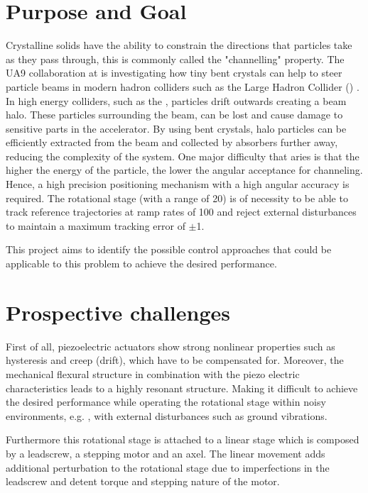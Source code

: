 \section{Purpose and Goal}
Crystalline solids have the ability to constrain the directions that particles take as they pass through, this is commonly called the "channelling" property. The UA9 collaboration at \abbrCERN is investigating how tiny bent crystals can help to steer particle beams in modern hadron colliders such as the Large Hadron Collider (\abbrLHC) \citep{WebsiteUA9:2016}. In high energy colliders, such as the \abbrLHC, particles drift outwards creating a beam halo. These particles surrounding the beam, can be lost and cause damage to sensitive parts in the accelerator. By using bent crystals, halo particles can be efficiently extracted from the beam and collected by absorbers further away, reducing the complexity of the system. One major difficulty that aries is that the higher the energy of the particle, the lower the angular acceptance for channeling. Hence, a high precision positioning mechanism with a high angular accuracy is required. The rotational stage (with a range of \unit{20}{\milli\rad}) is of necessity to be able to track reference trajectories at ramp rates of \unit{100}{\micro\radianpersecond} and reject external disturbances to maintain a maximum tracking error of $\pm$\unit{1}{\micro\rad}.

This project aims to identify the possible control approaches that could be applicable to this problem to achieve the desired performance.

\section{Prospective challenges}
First of all, piezoelectric  actuators show strong nonlinear properties such as hysteresis and creep (drift), which have to be compensated for. Moreover, the mechanical flexural structure in combination with the piezo electric characteristics leads to a highly resonant structure. Making it difficult to achieve the desired performance while operating the rotational stage within noisy environments, e.g. \abbrLHC, with external disturbances such as ground vibrations.

Furthermore this rotational stage is attached to a linear stage which is composed by a leadscrew, a stepping motor and an axel. The linear movement adds additional perturbation to the rotational stage due to imperfections in the leadscrew and detent torque and stepping nature of the motor.

